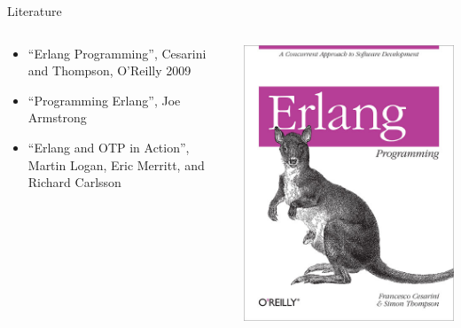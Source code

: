 \begin{frame}{Literature}

\pause
\begin{columns}
 \begin{column}{0.6\linewidth}
  \begin{itemize}
    \item ``Erlang Programming'', Cesarini and Thompson, O'Reilly 2009
    \item ``Programming Erlang'', Joe Armstrong
    \item ``Erlang and OTP in Action'', Martin Logan, Eric Merritt, and Richard Carlsson
  \end{itemize}
 \end{column}
 \begin{column}{0.4\linewidth}
  \includegraphics[width=\linewidth]{coursebook.jpg}
 \end{column}
\end{columns}
  
\end{frame}


